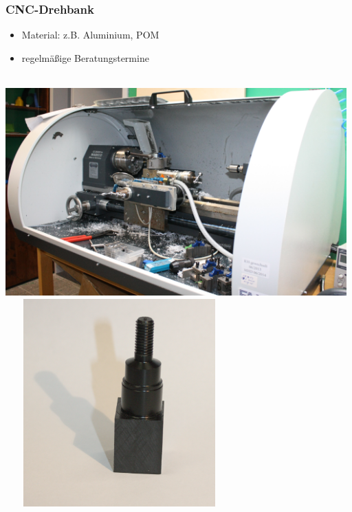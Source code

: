 \documentclass[t]{beamer}
\begin{document}
\begin{frame}
    \frametitle{CNC-Drehbank}
    \begin{itemize}
        \item Material: z.B. Aluminium, POM
        \item regelmäßige Beratungstermine
    \end{itemize}
        \begin{center}
    ~\\
        \includegraphics[height=8cm]{../img/drehbank.png}
        ~~~
        \includegraphics[height=8cm]{../img/drehstueck.png}
    \end{center}
\end{frame}
\end{document}
